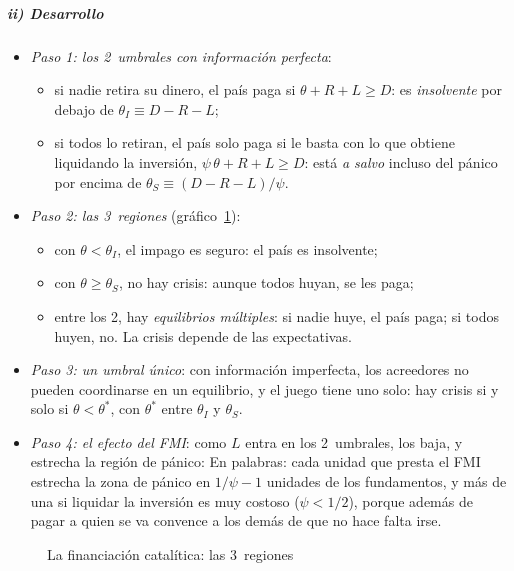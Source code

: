 \documentclass[11pt]{article}
\begin{document}
\subparagraph{ii) Desarrollo}

\begin{itemize}
\item \emph{Paso 1: los 2~umbrales con información perfecta}:
  \begin{itemize}
  \item si nadie retira su dinero, el país paga si $\theta+R+L\geq D$: es \emph{insolvente} por debajo de $\theta_I\equiv D-R-L$;
  \item si todos lo retiran, el país solo paga si le basta con lo que obtiene liquidando la inversión, $\psi\,\theta+R+L\geq D$: está \emph{a salvo} incluso del pánico por encima de $\theta_S\equiv(D-R-L)/\psi$.
  \end{itemize}
\item \emph{Paso 2: las 3~regiones} (gráfico~\ref{fig:catalitica}):
  \begin{itemize}
  \item con $\theta<\theta_I$, el impago es seguro: el país es insolvente;
  \item con $\theta\geq\theta_S$, no hay crisis: aunque todos huyan, se les paga;
  \item entre los 2, hay \emph{equilibrios múltiples}: si nadie huye, el país paga; si todos huyen, no. La crisis depende de las expectativas.
  \end{itemize}
\item \emph{Paso 3: un umbral único}: con información imperfecta, los acreedores no pueden coordinarse en un equilibrio, y el juego tiene uno solo: hay crisis si y solo si $\theta<\theta^*$, con $\theta^*$ entre $\theta_I$ y $\theta_S$\nocite{MorrisShin1998}.
\item \emph{Paso 4: el efecto del FMI}: como $L$ entra en los 2~umbrales, los baja, y estrecha la región de pánico:
  En palabras: cada unidad que presta el FMI estrecha la zona de pánico en $1/\psi-1$ unidades de los fundamentos, y más de una si liquidar la inversión es muy costoso ($\psi<1/2$), porque además de pagar a quien se va convence a los demás de que no hace falta irse.
\end{itemize}

\begin{figure}[H]
\centering
\caption{La financiación catalítica: las 3~regiones}\label{fig:catalitica}
\end{figure}
\end{document}
